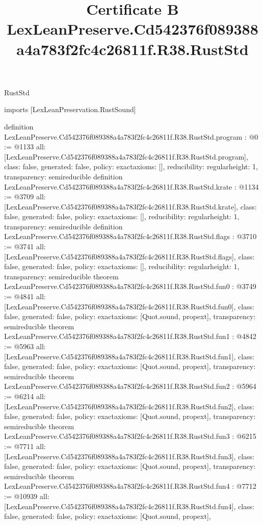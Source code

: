 \begin{lexlean}{RustStd}
\title{Certificate B LexLeanPreserve.Cd542376f089388a4a783f2fc4c26811f.R38.RustStd}
\begin{coremodule}
imports [LexLeanPreservation.RustSound]

definition LexLeanPreserve.Cd542376f089388a4a783f2fc4c26811f.R38.RustStd.program : @0 := @1133 {
  all: [LexLeanPreserve.Cd542376f089388a4a783f2fc4c26811f.R38.RustStd.program],
  class: false,
  generated: false,
  policy: exact{axioms: []},
  reducibility: regular{height: 1},
  transparency: semireducible
}
definition LexLeanPreserve.Cd542376f089388a4a783f2fc4c26811f.R38.RustStd.krate : @1134 := @3709 {
  all: [LexLeanPreserve.Cd542376f089388a4a783f2fc4c26811f.R38.RustStd.krate],
  class: false,
  generated: false,
  policy: exact{axioms: []},
  reducibility: regular{height: 1},
  transparency: semireducible
}
definition LexLeanPreserve.Cd542376f089388a4a783f2fc4c26811f.R38.RustStd.flags : @3710 := @3741 {
  all: [LexLeanPreserve.Cd542376f089388a4a783f2fc4c26811f.R38.RustStd.flags],
  class: false,
  generated: false,
  policy: exact{axioms: []},
  reducibility: regular{height: 1},
  transparency: semireducible
}
theorem LexLeanPreserve.Cd542376f089388a4a783f2fc4c26811f.R38.RustStd.fun0 : @3749 := @4841 {
  all: [LexLeanPreserve.Cd542376f089388a4a783f2fc4c26811f.R38.RustStd.fun0],
  class: false,
  generated: false,
  policy: exact{axioms: [Quot.sound, propext]},
  transparency: semireducible
}
theorem LexLeanPreserve.Cd542376f089388a4a783f2fc4c26811f.R38.RustStd.fun1 : @4842 := @5963 {
  all: [LexLeanPreserve.Cd542376f089388a4a783f2fc4c26811f.R38.RustStd.fun1],
  class: false,
  generated: false,
  policy: exact{axioms: [Quot.sound, propext]},
  transparency: semireducible
}
theorem LexLeanPreserve.Cd542376f089388a4a783f2fc4c26811f.R38.RustStd.fun2 : @5964 := @6214 {
  all: [LexLeanPreserve.Cd542376f089388a4a783f2fc4c26811f.R38.RustStd.fun2],
  class: false,
  generated: false,
  policy: exact{axioms: [Quot.sound, propext]},
  transparency: semireducible
}
theorem LexLeanPreserve.Cd542376f089388a4a783f2fc4c26811f.R38.RustStd.fun3 : @6215 := @7711 {
  all: [LexLeanPreserve.Cd542376f089388a4a783f2fc4c26811f.R38.RustStd.fun3],
  class: false,
  generated: false,
  policy: exact{axioms: [Quot.sound, propext]},
  transparency: semireducible
}
theorem LexLeanPreserve.Cd542376f089388a4a783f2fc4c26811f.R38.RustStd.fun4 : @7712 := @10939 {
  all: [LexLeanPreserve.Cd542376f089388a4a783f2fc4c26811f.R38.RustStd.fun4],
  class: false,
  generated: false,
  policy: exact{axioms: [Quot.sound, propext]},
}
\end{coremodule}
\end{lexlean}
